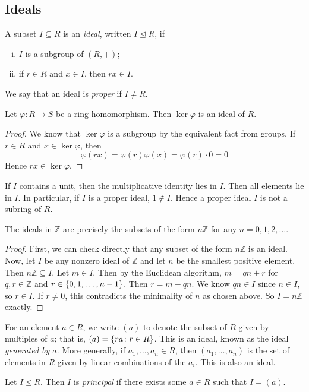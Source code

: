 \subsection{Ideals}
\begin{definition}
	A subset \( I \subseteq R \) is an \textit{ideal}, written \( I \trianglelefteq R \), if
	\begin{enumerate}[(i)]
		\item \( I \) is a subgroup of \( (R, +) \);
		\item if \( r \in R \) and \( x \in I \), then \( rx \in I \).
	\end{enumerate}
	We say that an ideal is \textit{proper} if \( I \neq R \).
\end{definition}
\begin{lemma}
	Let \( \varphi \colon R \to S \) be a ring homomorphism.
	Then \( \ker \varphi \) is an ideal of \( R \).
\end{lemma}
\begin{proof}
	We know that \( \ker \varphi \) is a subgroup by the equivalent fact from groups.
	If \( r \in R \) and \( x \in \ker \varphi \), then
	\[ \varphi(rx) = \varphi(r) \varphi(x) = \varphi(r) \cdot 0 = 0 \]
	Hence \( rx \in \ker \varphi \).
\end{proof}
\begin{remark}
	If \( I \) contains a unit, then the multiplicative identity lies in \( I \).
	Then all elements lie in \( I \).
	In particular, if \( I \) is a proper ideal, \( 1 \not\in I \).
	Hence a proper ideal \( I \) is not a subring of \( R \).
\end{remark}
\begin{lemma}
	The ideals in \( \mathbb Z \) are precisely the subsets of the form \( n\mathbb Z \) for any \( n = 0, 1, 2, \dots \).
\end{lemma}
\begin{proof}
	First, we can check directly that any subset of the form \( n\mathbb Z \) is an ideal.
	Now, let \( I \) be any nonzero ideal of \( \mathbb Z \) and let \( n \) be the smallest positive element.
	Then \( n\mathbb Z \subseteq I \).
	Let \( m \in I \).
	Then by the Euclidean algorithm, \( m = qn+r \) for \( q,r \in \mathbb Z \) and \( r \in \qty{0, 1, \dots, n-1} \).
	Then \( r = m - qn \).
	We know \( qn \in I \) since \( n \in I \), so \( r \in I \).
	If \( r \neq 0 \), this contradicts the minimality of \( n \) as chosen above.
	So \( I = n\mathbb Z \) exactly.
\end{proof}
\begin{definition}
	For an element \( a \in R \), we write \( (a) \) to denote the subset of \( R \) given by multiples of \( a \); that is, \( (a) = \qty{ra \colon r\in R} \).
	This is an ideal, known as the ideal \textit{generated by \( a \)}.
	More generally, if \( a_1, \dots, a_n \in R \), then \( (a_1, \dots, a_n) \) is the set of elements in \( R \) given by linear combinations of the \( a_i \).
	This is also an ideal.
\end{definition}
\begin{definition}
	Let \( I \trianglelefteq R \).
	Then \( I \) is \textit{principal} if there exists some \( a \in R \) such that \( I = (a) \).
\end{definition}

